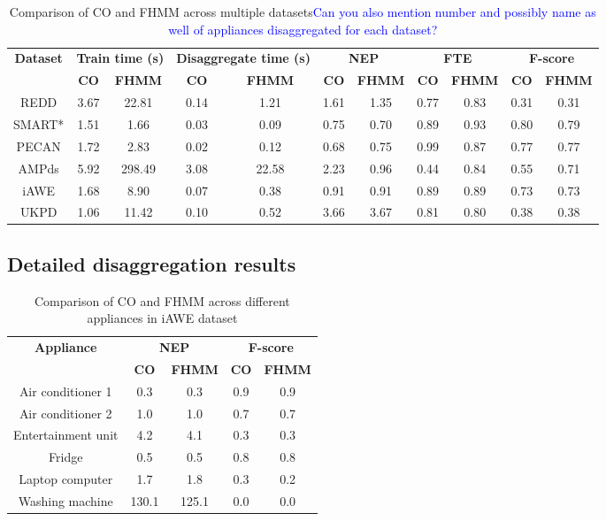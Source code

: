 \documentclass{sig-alternate}
\newcommand{\bluecolor}[1]{\textcolor{blue}{#1}}
\begin{document}
\begin{table}
\centering
\begin{tabular}{ccccccccccc}
\hline\textbf{Dataset} & \multicolumn{2}{c}{\textbf{Train time (s)}}& \multicolumn{2}{c}{\textbf{Disaggregate time (s)}} &\multicolumn{2}{c}{\textbf{NEP}}    & \multicolumn{2}{c}{\textbf{FTE}} &\multicolumn{2}{c}{\textbf{F-score}} \\ 
~ &\textbf{CO} & \textbf{FHMM} &\textbf{CO} & \textbf{FHMM} &\textbf{CO} & \textbf{FHMM} &\textbf{CO} & \textbf{FHMM}&\textbf{CO} & \textbf{FHMM} \\ \hline 
REDD &3.67 &22.81 &0.14 &1.21 &1.61 &1.35 &0.77 &0.83 &0.31 &0.31\\ 
SMART* &1.51 &1.66 &0.03 &0.09 &0.75 &0.70 &0.89 &0.93 &0.80 &0.79\\ 
PECAN &1.72 &2.83 &0.02 &0.12 &0.68 &0.75 &0.99 &0.87 &0.77 &0.77\\ 
AMPds &5.92 &298.49 &3.08 &22.58 &2.23 &0.96 &0.44 &0.84 &0.55 &0.71\\ 
iAWE &1.68 &8.90 &0.07 &0.38 &0.91 &0.91 &0.89 &0.89 &0.73 &0.73\\ 
UKPD &1.06 &11.42 &0.10 &0.52 &3.66 &3.67 &0.81 &0.80 &0.38 &0.38\\
\hline
\end{tabular}
\caption{Comparison of CO and FHMM across multiple datasets\bluecolor{Can you also mention number and possibly name as well of appliances disaggregated for each dataset?}}
\label{table:disaggregation}
\end{table}

\subsection{Detailed disaggregation results	}


\begin{table}
    \begin{tabular}{ccccc}
    \hline \textbf{Appliance} & \multicolumn{2}{c}{\textbf{NEP}} & \multicolumn{2}{c}{\textbf{F-score}}\\
    ~                  & \textbf{CO}    & \textbf{FHMM}  & \textbf{CO}      & \textbf{FHMM} \\ \hline
    Air conditioner 1  & 0.3   & 0.3   & 0.9     & 0.9  \\
    Air conditioner 2  & 1.0   & 1.0   & 0.7     & 0.7  \\
    Entertainment unit & 4.2   & 4.1   & 0.3     & 0.3  \\
    Fridge             & 0.5   & 0.5   & 0.8     & 0.8  \\
    Laptop computer    & 1.7   & 1.8   & 0.3     & 0.2  \\
    Washing machine    & 130.1 & 125.1 & 0.0     & 0.0  \\
    \hline \end{tabular}
    \caption{Comparison of CO and FHMM across different appliances in iAWE dataset}
\label{table:disaggregation_iawe}
\end{table}
\end{document}
